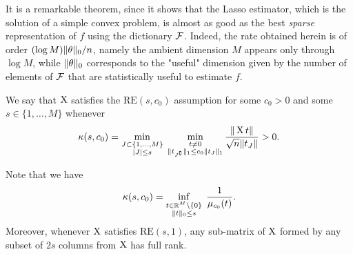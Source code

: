 It is a remarkable theorem, since it shows that the Lasso estimator, which is the solution of a simple convex problem, is almost as good as the best \emph{sparse} representation of $f$ using the dictionary $\operatorname{{\mathcal F}}$.
Indeed, the rate obtained herein is of order $(\log M) \| \theta \|_0 / n$, namely the ambient dimension $M$ appears only through $\log M$, while $\| \theta \|_0$ corresponds to the "useful" dimension given by the number of elements of $\operatorname{{\mathcal F}}$ that are statistically useful to estimate $f$.
\begin{definition}
	We say that $\operatorname{{\boldsymbol X}}$ satisfies the $\text{RE}(s, c_0)$ assumption for some $c_0 > 0$ and some $s \in \{ 1, \ldots, M \}$ whenever
	\begin{equation*}
		\kappa(s, c_0) = 
		\min_{\substack{J \subset \{ 1, \ldots, M \} \\ 
			  |J| \leq s}}
			\;
		\min_{\substack{t \neq 0 \\ 
		\| t_{J^\complement} \|_1 \leq c_0 \| t_J \|_1}}
		\frac{\| \operatorname{{\boldsymbol X}} t \|}{\sqrt n \| t_J \|} > 0.
	\end{equation*}
\end{definition}
Note that we have
\begin{equation*}
	\kappa(s, c_0) = \inf_{\substack{t \in \mathbb R^M \setminus \{ 0 \}\\ 
	\| t \|_0 \leq s}}
	\; \frac{1}{\mu_{c_0}(t)}.
\end{equation*}
Moreover, whenever $\operatorname{{\boldsymbol X}}$ satisfies $\text{RE}(s, 1)$, any sub-matrix of $\operatorname{{\boldsymbol X}}$ formed by any subset of $2 s$ columns from $\operatorname{{\boldsymbol X}}$ has full rank.%

